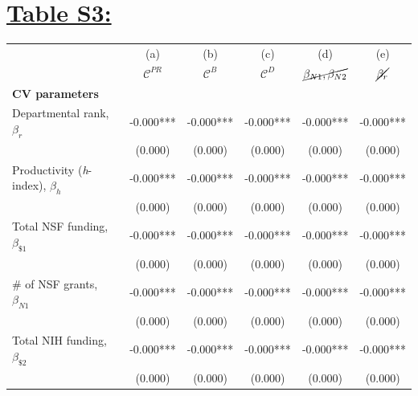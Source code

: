 \documentclass{article}\usepackage[]{graphicx}\usepackage[]{color}
\begin{document}
\section*{\underline{Table S3:}}
\begin{table}[h!]
  \begin{center}
  \label{tab:table1}
  \begin{tabular}{l c c c c c}
  
    \hline
    \hline
    
    {} & {(a)} & {(b)} & {(c)} & {(d)} & {(e)}  \\
    {} & {$\mathscr{C}^{PR}$} & {$\mathscr{C}^{B}$} & {$\mathscr{C}^{D}$} & {$\cancel{\beta_{N1},\beta_{N2}}$} & {$\cancel{\beta_{r}}$}  \\
    
    \hline
    
    \textbf {CV parameters}\\
    
    \rowcolor{gray!33}
    Departmental rank, $\beta_{r}$ 
    & -0.000*** & -0.000***  & -0.000*** & -0.000*** & -0.000*** \\
    {} 
    & (0.000)   & (0.000)    & (0.000)   & (0.000)   & (0.000) \\
    
    \rowcolor{gray!33}
    Productivity (\textit{h}-index), $\beta_{h}$ 
    & -0.000*** & -0.000***  & -0.000*** & -0.000*** & -0.000*** \\
    {} 
    & (0.000)   & (0.000)    & (0.000)   & (0.000)   & (0.000) \\
    
    \rowcolor{gray!33}
    Total NSF funding, $\beta_{\$1}$ 
    & -0.000*** & -0.000***  & -0.000*** & -0.000*** & -0.000*** \\
    {} 
    & (0.000)   & (0.000)    & (0.000)   & (0.000)   & (0.000) \\
    
    \rowcolor{gray!33}
    {\#} of NSF grants, $\beta_{N1}$ 
    & -0.000*** & -0.000***  & -0.000*** & -0.000*** & -0.000*** \\
    {} 
    & (0.000)   & (0.000)    & (0.000)   & (0.000)   & (0.000) \\
    
    \rowcolor{gray!33}
    Total NIH funding, $\beta_{\$2}$ 
    & -0.000*** & -0.000***  & -0.000*** & -0.000*** & -0.000*** \\
    {} 
    & (0.000)   & (0.000)    & (0.000)   & (0.000)   & (0.000) \\
    

\end{tabular}
\end{center}
\end{table}
\end{document}
